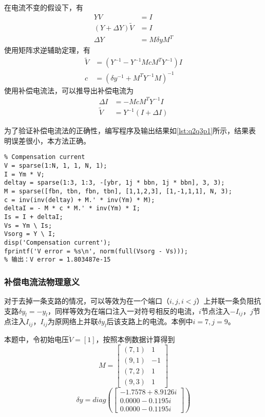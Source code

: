 \documentclass[a4paper,12pt]{article}
\begin{document}
    在电流不变的假设下，有
    \begin{equation}
      \begin{aligned}
        YV&=I\\
        (Y+\Delta Y)\widetilde V&=I\\
        \Delta Y&=M\delta y M^T
      \end{aligned}
    \end{equation}
    使用矩阵求逆辅助定理，有
    \begin{equation}
      \begin{aligned}
        \widetilde V&=(Y^{-1}-Y^{-1}McM^TY^{-1})I\\
        c&=(\delta y^{-1}+M^TY^{-1}M)^{-1}
      \end{aligned}
    \end{equation}
    使用补偿电流法，可以推导出补偿电流为
    \begin{equation}
      \begin{aligned}
        \Delta I&=-McM^TY^{-1}I\\
        \widetilde V&=Y^{-1}(I+\Delta I)
      \end{aligned}
    \end{equation}

    为了验证补偿电流法的正确性，编写程序及输出结果如\cref{lst:q2q3p1}所示，结果表明误差很小，本方法正确。
    \begin{lstlisting}[style=Matlab-editor,basicstyle=\mlttfamily,label=lst:q2q3p1,caption={补偿电流法}]
%% Compensation method
% Compensation current
V = sparse(1:N, 1, 1, N, 1);
I = Ym * V;
deltay = sparse(1:3, 1:3, -[ybr, 1j * bbn, 1j * bbn], 3, 3);
M = sparse([fbn, tbn, fbn, tbn], [1,1,2,3], [1,-1,1,1], N, 3);
c = inv(inv(deltay) + M.' * inv(Ym) * M);
deltaI = - M * c * M.' * inv(Ym) * I;
Is = I + deltaI;
Vs = Ym \ Is;
Vsorg = Y \ I;
disp('Compensation current');
fprintf('V error = %s\n', norm(full(Vsorg - Vs)));
% 输出：V error = 1.803487e-15
    \end{lstlisting}
    \subsubsection{补偿电流法物理意义}
    对于去掉一条支路的情况，可以等效为在一个端口（$i,j,i<j$）上并联一条负阻抗支路$\delta y_l=-y_l$，同样等效为在端口注入一对符号相反的电流，$i$节点注入$-I_{ij}$，$j$节点注入$I_{ij}$，$I_{ij}$为原网络上并联$\delta y_l$后该支路上的电流。本例中$i=7,j=9$。

    本题中，令初始电压$\dot V=[1]$，按照本例数据计算得到
    $$M=\begin{bmatrix}
      (7,1) & 1\\
      (9,1) & -1\\
      (7,2) & 1\\
      (9,3) & 1
    \end{bmatrix}$$
    $$\delta y=diag(\begin{bmatrix}
      -1.7578 + 8.9126i\\
      0.0000 - 0.1195i\\
      0.0000 - 0.1195i
    \end{bmatrix})$$
\end{document}
